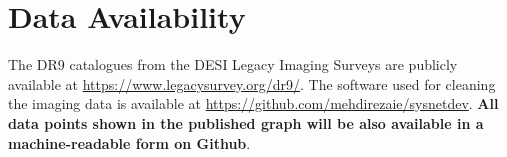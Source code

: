 \section*{Data Availability}
\label{sec:dataavail}
The DR9 catalogues from the DESI Legacy Imaging Surveys are publicly available at \href{https://www.legacysurvey.org/dr9/}{https://www.legacysurvey.org/dr9/}. The software used for cleaning the imaging data is available at \href{https://github.com/mehdirezaie/sysnetdev}{https://github.com/mehdirezaie/sysnetdev}. \textbf{All data points shown in the published graph will be also available in a machine-readable form on Github}.